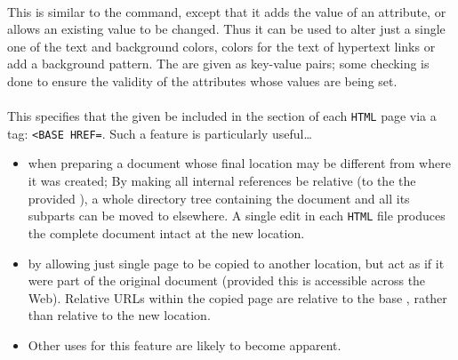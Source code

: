 %
\paragraph*{\texttt{}\label{htmlbody}}
\begin{changebar}
This is similar to the  command, except that it adds the
value of an attribute, or allows an existing value to be changed.
Thus it can be used to alter just a single one of the text and background colors, 
colors for the text of hypertext links or add a background pattern.
The  are given as key-value pairs; some checking is done to ensure 
the validity of the attributes whose values are being set.%
\end{changebar}%

%
\paragraph*{\texttt{}\label{htmlbase}}
\begin{changebar}
This specifies that the given  be included in the  section
of each \texttt{HTML} page via a tag: 
\texttt{<BASE HREF=}.\html{\\}
Such a feature is particularly useful\dots 
\begin{itemize}
\item
when preparing a document whose final location may be different from where it was created; 
By making all internal references be relative (to the the provided ),
a whole directory tree containing the document 
and all its subparts can be moved to elsewhere.
A single edit in each \texttt{HTML} file produces the complete document intact 
at the new location.
%
\item
by allowing just single page to be copied to another location, but act as if it were
part of the original document (provided this is accessible across the Web).
Relative URLs within the copied page are relative to the base ,
rather than relative to the new location.
%
\item
Other uses for this feature are likely to become apparent.%
\end{itemize}\end{changebar}%


%
%
